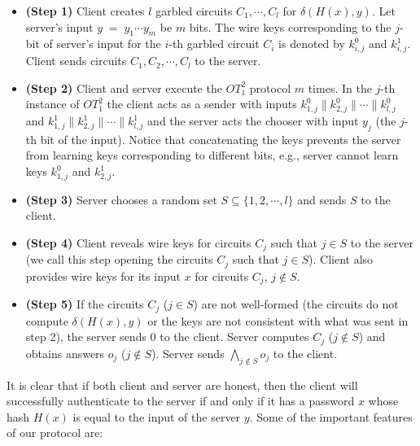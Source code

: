 \begin{itemize}

\item {\bf (Step 1)}  Client creates $l$ garbled circuits $C_1,\cdots,C_l$ for $\delta (H(x), y)$. Let server's 
input $y \; = \; y_1 \cdots y_m$ be $m$ bits. The wire keys corresponding
to the $j$-bit of server's input for the $i$-th garbled circuit $C_i$
is denoted by $k^0_{i,j}$ and $k^1_{i,j}$. Client sends circuits
$C_1,C_2,\cdots,C_l$ to the server.

\item {\bf (Step 2)} Client and server execute the $OT_1^2$ protocol $m$ times. In the $j$-th instance of $OT_1^2$ the
client acts as a sender with inputs $k^0_{1,j} \| k^0_{2,j} \| \cdots
\| k^0_{l,j}$ and $k^1_{1,j} \| k^1_{2,j} \| \cdots \| k^1_{l,j}$ and
the server acts the chooser with input $y_j$ (the $j$-th bit of the
input). Notice that concatenating the keys prevents the server from
learning keys corresponding to different bits, e.g., server cannot
learn keys $k^0_{1,j}$ and $k^1_{2,j}$.

\item {\bf (Step 3)} Server chooses a random set $S \subseteq \{ 1,2, \cdots , l \}$ and sends $S$ to the client.

\item {\bf (Step 4)} Client reveals wire keys for circuits $C_j$ such that $j \in S$ to the server (we call this step opening the
circuits $C_j$ such that $j \in S$). Client also provides wire keys for its input $x$ for circuits $C_j$, $j \not\in S$.

\item {\bf (Step 5)} If the circuits $C_j$ ($j \in S$) are not well-formed (the circuits do not compute $\delta (H(x),y)$ or the 
keys are not consistent with what was sent in step 2), the server
sends $0$ to the client. Server computes $C_j$ ($j \not\in S$) and
obtains answers $o_j$ ($j \not\in S$). Server sends $\bigwedge_{j
\not\in S} o_j$ to the client.

\end{itemize}

It is clear that if both client and server are honest, then the client
will successfully authenticate to the server if and only if it has a
password $x$ whose hash $H(x)$ is equal to the input of the server
$y$. Some of the important features of our protocol are:

